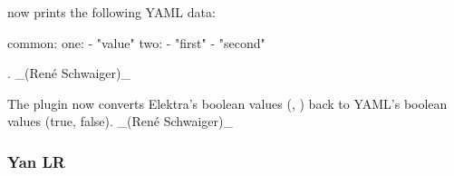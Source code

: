 

now prints the following Y\+A\+ML data\+:


\begin{DoxyCode}
common:
  one:
    - "value"
  two:
    - "first"
    - "second"
\end{DoxyCode}


. \+\_\+(René Schwaiger)\+\_\+


\begin{DoxyItemize}
\item The plugin now converts Elektra’s boolean values ({}, {}) back to Y\+A\+M\+L’s boolean values ({\ttfamily true}, {\ttfamily false}). \+\_\+(René Schwaiger)\+\_\+
\end{DoxyItemize}

\subsubsection*{Yan LR}


